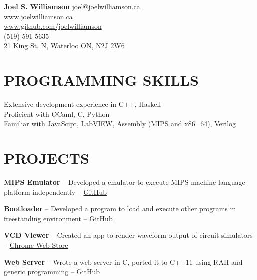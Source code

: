 \documentclass{res}
\begin{document}
 

\begin{center}
{\Large\bf Joel S. Williamson}
{\center \href{mailto:joel@joelwilliamson.ca}{joel@joelwilliamson.ca}\\\url{www.joelwilliamson.ca}\\\url{www.github.com/joelwilliamson}\\
(519) 591-5635\\21 King St. N, Waterloo ON, N2J 2W6 }
\end{center}
\vspace{-1cm}                 
\begin{resume}

\section{PROGRAMMING SKILLS}          
  \vspace{3mm}
    Extensive development experience in C++, Haskell\\
    Proficient with OCaml, C, Python\\
    Familiar with JavaScipt, LabVIEW, Assembly (MIPS and x86\_64), Verilog
 

\section{PROJECTS}
  \vspace{3mm}
    {\bf MIPS Emulator} -- Developed a emulator to execute MIPS machine language platform independently --
    \href{https://github.com/joelwilliamson/MIPS-emulator}{GitHub}
    \vspace{-3mm}
    
    {\bf Bootloader} -- Developed a program to load and execute other programs in freestanding environment --
    \href{https://github.com/joelwilliamson/AMD64/tree/master/barebones}{GitHub}
    \vspace{-3mm}
    
    {\bf VCD Viewer} -- Created an app to render waveform output of circuit simulators --
    \href{https://chrome.google.com/webstore/detail/vcd-viewer/fpacodjpmmabkjooobgbpgpmgbfjidkg?hl=en-US}{Chrome Web Store}
    \vspace{-3mm}
    
    {\bf Web Server} -- Wrote a web server in C, ported it to C++11 using RAII and generic programming --
    \href{https://www.github.com/joelwilliamson/JServer}{GitHub}
    \vspace{-3mm}


\end{resume}
\end{document}

